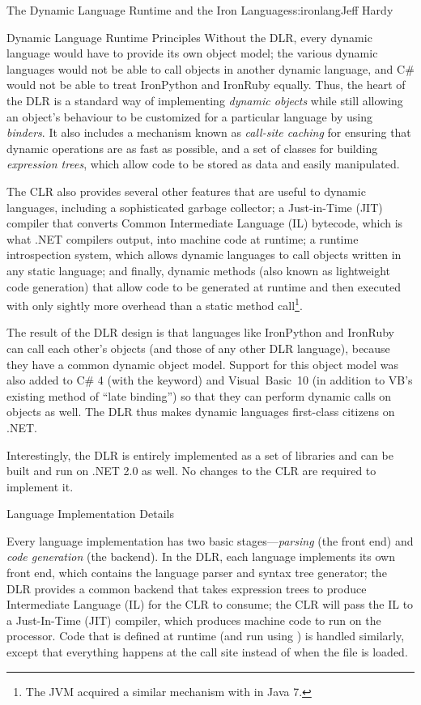 \begin{aosachapter}{The Dynamic Language Runtime and the Iron Languages}{s:ironlang}{Jeff Hardy}
\begin{aosasect1}{Dynamic Language Runtime Principles}
Without the DLR, every dynamic language would have to provide its own object
model; the various dynamic languages would not be able to call objects in
another dynamic language, and C\# would not be able to treat IronPython and
IronRuby equally. Thus, the heart of the DLR is a standard way of implementing
\emph{dynamic objects} while still allowing an object's behaviour to be
customized for a particular language by using \emph{binders}. It also includes
a mechanism known as \emph{call-site caching} for ensuring that dynamic
operations are as fast as possible, and a set of classes for building
\emph{expression trees}, which allow code to be stored as data and easily
manipulated.

The CLR also provides several other features that are useful to dynamic
languages, including a sophisticated garbage collector; a Just-in-Time (JIT)
compiler that converts Common Intermediate Language (IL) bytecode, which is
what .NET compilers output, into machine code at runtime; a runtime
introspection system, which allows dynamic languages to call objects written in
any static language; and finally, dynamic methods (also known as lightweight
code generation) that allow code to be generated at runtime and then executed
with only sightly more overhead than a static method call\footnote{The JVM
acquired a similar mechanism with  in Java 7.}.

The result of the DLR design is that languages like IronPython and IronRuby can
call each other's objects (and those of any other DLR language), because they
have a common dynamic object model. Support for this object model was also
added to C\# 4 (with the  keyword) and Visual~Basic~10 (in
addition to VB's existing method of ``late binding'') so that they can perform
dynamic calls on objects as well. The DLR thus makes dynamic languages
first-class citizens on .NET.

Interestingly, the DLR is entirely implemented as a set of libraries and can be
built and run on .NET 2.0 as well. No changes to the CLR are required to
implement it.

\end{aosasect1}

\begin{aosasect1}{Language Implementation Details}

Every language implementation has two basic stages---\emph{parsing} (the
front end) and \emph{code generation} (the backend). In the DLR, each language
implements its own front end, which contains the language parser and syntax tree
generator; the DLR provides a common backend that takes expression trees to
produce Intermediate Language (IL) for the CLR to consume; the CLR will pass
the IL to a Just-In-Time (JIT) compiler, which produces machine code to run on
the processor. Code that is defined at runtime (and run using ) is
handled similarly, except that everything happens at the  call site
instead of when the file is loaded.


\end{aosasect1}
\end{aosachapter}
